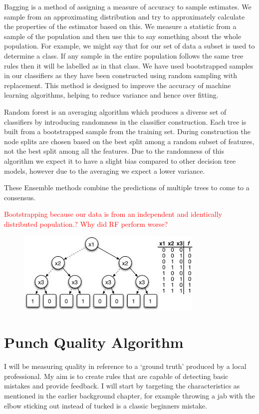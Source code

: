 Bagging is a method of assigning a measure of accuracy to sample estimates. We sample from an approximating distribution and try to approximately calculate the
properties of the estimator based on this. We measure a statistic from a sample of the population and then use this to say something about the whole population. For example, we might say that for our set of data a subset is used to determine a class. If any sample in the entire population follows the same tree rules then it will be labelled as in that class. We have used bootstrapped samples in our classifiers as they have been constructed using random sampling with replacement. 
This method is designed to improve the accuracy of machine learning algorithms, helping to reduce variance and hence over fitting. 

Random forest is an averaging algorithm which produces a diverse set of classifiers by introducing randomness in the classifier construction. Each tree is built from a bootstrapped sample from the training set. During construction the node splits are chosen based on the best split among a random subset of features, not the best split among all the features. Due to the randomness of this algorithm we expect it to have a slight bias compared to other decision tree models, however due to the averaging we expect a lower variance.

These Ensemble methods combine the predictions of multiple trees to come to a consensus.

\textcolor{red}{Bootstrapping because our data is from an independent and identically distributed
population.?}
\textcolor{red}{Why did RF perform worse?}
 


\begin{figure}[h]
    \centering
    \includegraphics[height=0.25\textheight]{fig02/dtree}
    \label{fig:kinect}
\end{figure}


\section{Punch Quality Algorithm}
I will be measuring quality in reference to a `ground truth' produced by a local professional. My aim is to create rules that are capable of detecting basic mistakes and provide feedback. I will start by targeting the characteristics as mentioned in the earlier background chapter, for example 
throwing a jab with the elbow sticking out instead of tucked is a classic beginners mistake.

